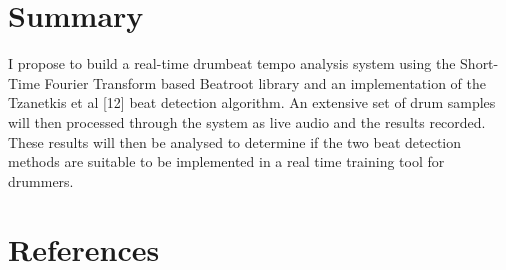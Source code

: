 \documentclass[a4paper, 11pt]{article}
\begin{document}
\section{Summary}
I propose to build a real-time drumbeat tempo analysis system using the Short-Time Fourier Transform based Beatroot library and an implementation of the Tzanetkis et al [12] beat detection algorithm. An extensive set of drum samples will then processed through the system as live audio and the results recorded. These results will then be analysed to determine if the two beat detection methods are suitable to be implemented in a real time training tool for drummers.


\maketitle{} 
\section{References}
\end{document}
